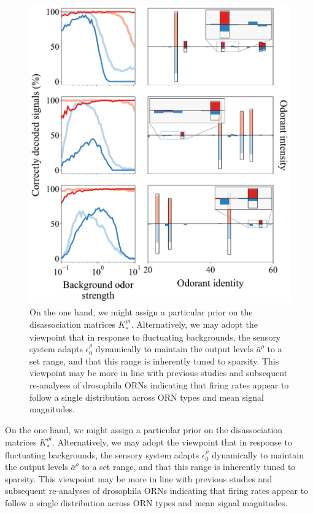 \documentclass[9pt,twocolumn,twoside]{pnas-new}
\begin{document}
\begin{figure}%
	\centering
	\includegraphics[width=.95\linewidth]{figures/signal_discrimination_weber_law/signal_discrimination_weber_law.pdf}
	\caption{On the one hand, we might assign a particular prior on the disassociation matrices $K_*^{\rho i}$. Alternatively, we may adopt the viewpoint that in response to fluctuating backgrounds, the sensory system adapts $\epsilon^\rho_0$ dynamically to maintain the output levels $\bar a^\rho$ to a set range, and that this range is inherently tuned to sparsity. This viewpoint may be more in line with previous studies and subsequent re-analyses of drosophila ORNs indicating that firing rates appear to follow a single distribution across ORN types and mean signal magnitudes. 
	}
	\label{fig:frog}
\end{figure}

On the one hand, we might assign a particular prior on the disassociation matrices $K_*^{\rho i}$. Alternatively, we may adopt the viewpoint that in response to fluctuating backgrounds, the sensory system adapts $\epsilon^\rho_0$ dynamically to maintain the output levels $\bar a^\rho$ to a set range, and that this range is inherently tuned to sparsity. This viewpoint may be more in line with previous studies and subsequent re-analyses of drosophila ORNs indicating that firing rates appear to follow a single distribution across ORN types and mean signal magnitudes. 
\end{document}
